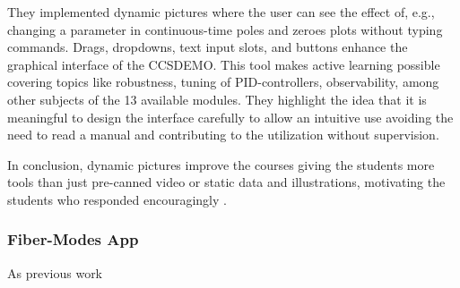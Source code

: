 They implemented dynamic pictures where the user can see the effect of, e.g., changing a parameter in continuous-time poles and zeroes plots without typing commands. Drags, dropdowns, text input slots, and buttons enhance the graphical interface of the CCSDEMO. This tool makes active learning possible covering topics like robustness, tuning of PID-controllers, observability, among other subjects of the 13 available modules. They highlight the idea that it is meaningful to design the interface carefully to allow an intuitive use avoiding the need to read a manual and contributing to the utilization without supervision.

In conclusion, dynamic pictures improve the courses giving the students more tools than just pre-canned video or static data and illustrations, motivating the students who responded encouragingly \cite{IEEEcontrol}.



\subsubsection{Fiber-Modes App}

As previous work